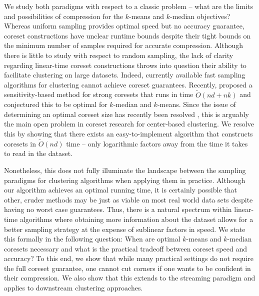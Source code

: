 We study both paradigms with respect to a classic problem -- what are the limits and possibilities of compression for the $k$-means and $k$-median objectives?
Whereas uniform sampling provides optimal speed but no accuracy guarantee, coreset constructions have
unclear runtime bounds despite their tight bounds on the minimum number of samples required for accurate compression. Although there is little to study with respect to random
sampling, the lack of clarity regarding linear-time coreset constructions throws into question their ability to facilitate clustering on large datasets. Indeed,
currently available fast sampling algorithms for clustering \cite{BachemL018} \cite{kmeans_sublinear_bachem16} cannot achieve coreset guarantees.
Recently, \cite{DSWY22} proposed a sensitivity-based method for strong coresets that runs in time
$\tilde{O}(nd + nk)$ and conjectured this to be optimal for $k$-median and $k$-means.  Since the issue of determining an optimal coreset size has recently
been resolved \cite{CSS21,CLSSS22,HLW23}, this is arguably the main open problem in coreset research for center-based clustering. We resolve this by showing that
there exists an easy-to-implement algorithm that constructs coresets in $\tilde{O}(nd)$ time -- only logarithmic factors away from the time it takes to read in
the dataset.

Nonetheless, this does not fully illuminate the landscape between the sampling paradigms for clustering algorithms when applying them in practice. Although our algorithm achieves an optimal
running time, it is certainly possible that other, cruder methods may be just as viable on most real world data sets despite having no worst case guarantees.
Thus, there is a natural spectrum within linear-time algorithms where obtaining more information about the dataset allows for a better
sampling strategy at the expense of sublinear factors in speed. We state this formally in the following question: When are optimal $k$-means and $k$-median
coresets necessary and what is the practical tradeoff between coreset speed and accuracy? To this end, we show that while many practical settings do not require
the full coreset guarantee, one cannot cut corners if one wants to be confident in their compression. We also
show that this extends to the streaming paradigm and applies to downstream clustering approaches.
